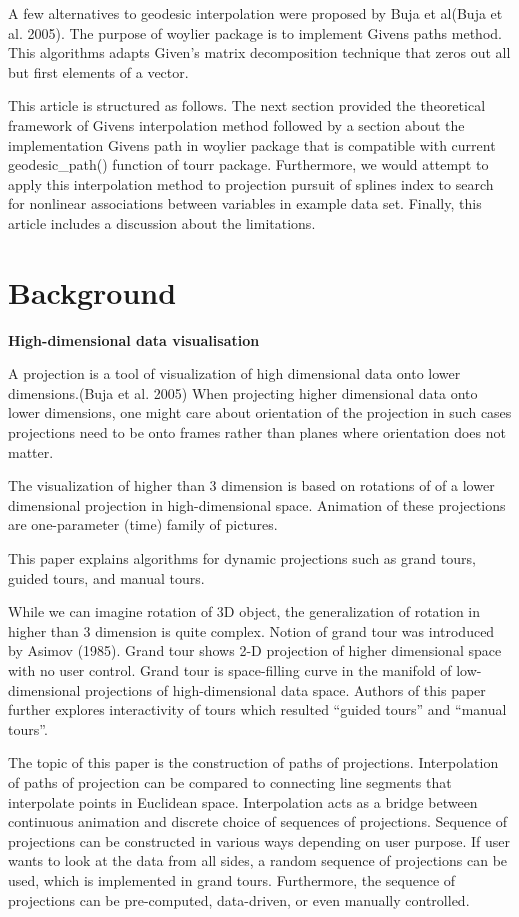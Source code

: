 A few alternatives to geodesic interpolation were proposed by Buja et al(Buja et al. 2005). The purpose of woylier package is to implement Givens paths method. This algorithms adapts Given's matrix decomposition technique that zeros out all but first elements of a vector.

This article is structured as follows. The next section provided the theoretical framework of Givens interpolation method followed by a section about the implementation Givens path in woylier package that is compatible with current geodesic\_path() function of tourr package. Furthermore, we would attempt to apply this interpolation method to projection pursuit of splines index to search for nonlinear associations between variables in example data set. Finally, this article includes a discussion about the limitations.

\hypertarget{background}{%
\section{Background}\label{background}}

\textbf{High-dimensional data visualisation}

A projection is a tool of visualization of high dimensional data onto lower dimensions.(Buja et al. 2005) When projecting higher dimensional data onto lower dimensions, one might care about orientation of the projection in such cases projections need to be onto frames rather than planes where orientation does not matter.

The visualization of higher than 3 dimension is based on rotations of of a lower dimensional projection in high-dimensional space. Animation of these projections are one-parameter (time) family of pictures.

This paper explains algorithms for dynamic projections such as grand tours, guided tours, and manual tours.

While we can imagine rotation of 3D object, the generalization of rotation in higher than 3 dimension is quite complex. Notion of grand tour was introduced by Asimov (1985). Grand tour shows 2-D projection of higher dimensional space with no user control. Grand tour is space-filling curve in the manifold of low-dimensional projections of high-dimensional data space. Authors of this paper further explores interactivity of tours which resulted ``guided tours'' and ``manual tours''.

The topic of this paper is the construction of paths of projections. Interpolation of paths of projection can be compared to connecting line segments that interpolate points in Euclidean space. Interpolation acts as a bridge between continuous animation and discrete choice of sequences of projections. Sequence of projections can be constructed in various ways depending on user purpose. If user wants to look at the data from all sides, a random sequence of projections can be used, which is implemented in grand tours. Furthermore, the sequence of projections can be pre-computed, data-driven, or even manually controlled.


